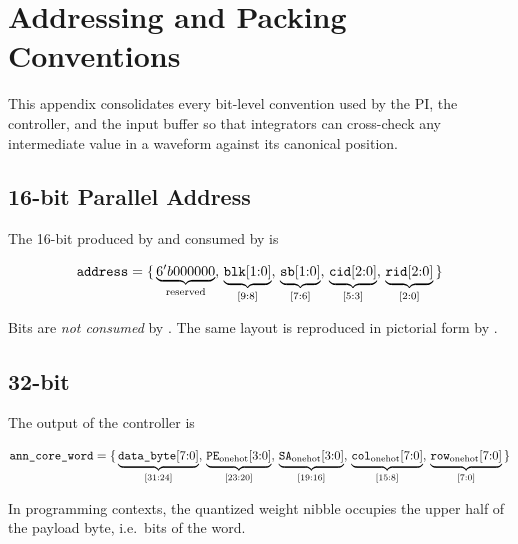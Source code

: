 
\chapter{Addressing and Packing Conventions}
\label{app:addressing}

This appendix consolidates every bit-level convention used by the PI,
the controller, and the input buffer so that integrators can cross-check
any intermediate value in a waveform against its canonical position.

\section{16-bit Parallel Address}
\label{app:addr-16}

The 16-bit  produced by 
and consumed by  is

\[
    \texttt{address} =
    \{\,\underbrace{6'b000000}_{\text{reserved}},\,
       \underbrace{\texttt{blk}[1{:}0]}_{\text{[9:8]}},\,
       \underbrace{\texttt{sb}[1{:}0]}_{\text{[7:6]}},\,
       \underbrace{\texttt{cid}[2{:}0]}_{\text{[5:3]}},\,
       \underbrace{\texttt{rid}[2{:}0]}_{\text{[2:0]}}\,\}
\]

Bits \sv{[15:10]} are \emph{not consumed} by .
The same layout is reproduced in pictorial form by
.

\section{32-bit }
\label{app:word-32}

The  output of the controller is

\[
    \texttt{ann\_core\_word} =
    \{\,\underbrace{\texttt{data\_byte}[7{:}0]}_{\text{[31:24]}},\,
       \underbrace{\texttt{PE}_{\text{onehot}}[3{:}0]}_{\text{[23:20]}},\,
       \underbrace{\texttt{SA}_{\text{onehot}}[3{:}0]}_{\text{[19:16]}},\,
       \underbrace{\texttt{col}_{\text{onehot}}[7{:}0]}_{\text{[15:8]}},\,
       \underbrace{\texttt{row}_{\text{onehot}}[7{:}0]}_{\text{[7:0]}}\,\}
\]

In programming contexts, the quantized weight nibble occupies the
upper half of the payload byte, i.e.\ bits \sv{[27:24]} of the word.

